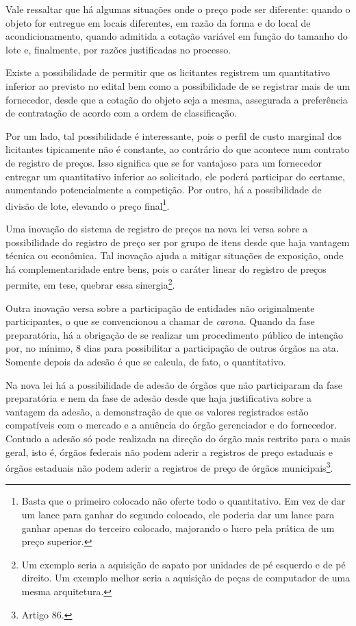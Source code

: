 Vale ressaltar que há algumas situações onde o preço pode ser diferente: quando o objeto for entregue em locais diferentes, em razão da forma e do local de acondicionamento, quando admitida a cotação variável em função do tamanho do lote e, finalmente, por razões justificadas no processo.

Existe a possibilidade de permitir que os licitantes registrem um quantitativo inferior ao previsto no edital bem como a possibilidade de se registrar mais de um fornecedor, desde que a cotação do objeto seja a mesma, assegurada a preferência de contratação de acordo com a ordem de classificação.

Por um lado, tal possibilidade é interessante, pois o perfil de custo marginal dos licitantes tipicamente não é constante, ao contrário do que acontece num contrato de registro de preços. Isso significa que se for vantajoso para um fornecedor entregar um quantitativo inferior ao solicitado, ele poderá participar do certame, aumentando potencialmente a competição. Por outro, há a possibilidade de divisão de lote, elevando o preço final\footnote{Basta que o primeiro colocado não oferte todo o quantitativo. Em vez de dar um lance para ganhar do segundo colocado, ele poderia dar um lance para ganhar apenas do terceiro colocado, majorando o lucro pela prática de um preço superior.}.

Uma inovação do sistema de registro de preços na nova lei versa sobre a possibilidade do registro de preço ser por grupo de itens desde que haja vantagem técnica ou econômica. Tal inovação ajuda a mitigar situações de exposição, onde há complementaridade entre bens, pois o caráter linear do registro de preços permite, em tese, quebrar essa sinergia\footnote{Um exemplo seria a aquisição de sapato por unidades de pé esquerdo e de pé direito. Um exemplo melhor seria a aquisição de peças de computador de uma mesma arquitetura.}.

Outra inovação versa sobre a participação de entidades não originalmente participantes, o que se convencionou a chamar de \emph{carona}. Quando da fase preparatória, há a obrigação de se realizar um procedimento público de intenção por, no mínimo, 8 dias para possibilitar a participação de outros órgãos na ata. Somente depois da adesão é que se calcula, de fato, o quantitativo.

Na nova lei há a possibilidade de adesão de órgãos que não participaram da fase preparatória e nem da fase de adesão desde que haja justificativa sobre a vantagem da adesão, a demonstração de que os valores registrados estão compatíveis com o mercado e a anuência do órgão gerenciador e do fornecedor. Contudo a adesão só pode realizada na direção do órgão mais restrito para o mais geral, isto é, órgãos federais não podem aderir a registros de preço estaduais e órgãos estaduais não podem aderir a registros de preço de órgãos municipais\footnote{Artigo 86.}.


